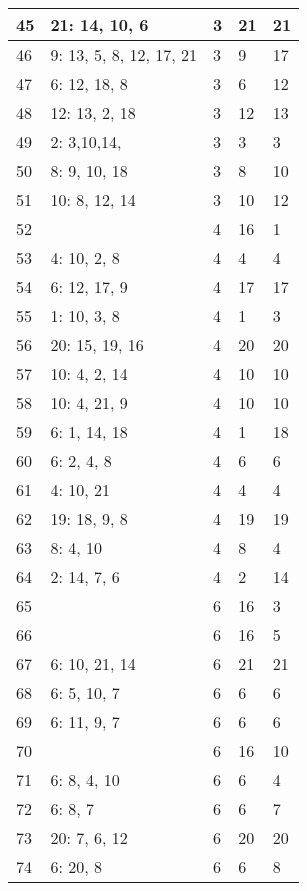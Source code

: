 \documentclass{article} %
\begin{document}
\begin{longtable}{| l | l | l | l | l |}
        45 & 21: 14, 10, 6 & 3 & 21 & 21 \\ \hline
        46 & 9: 13, 5, 8, 12, 17, 21 & 3 & 9 & 17 \\ \hline
        47 & 6: 12, 18, 8 & 3 & 6 & 12 \\ \hline
        48 & 12: 13, 2, 18 & 3 & 12 & 13 \\ \hline
        49 & 2: 3,10,14, & 3 & 3 & 3 \\ \hline
        50 & 8: 9, 10, 18 & 3 & 8 & 10 \\ \hline
        51 & 10: 8, 12, 14 & 3 & 10 & 12 \\ \hline
        52 &  & 4 & 16 & 1 \\ \hline
        53 & 4: 10, 2, 8 & 4 & 4 & 4 \\ \hline
        54 & 6: 12, 17, 9 & 4 & 17 & 17 \\ \hline
        55 & 1: 10, 3, 8 & 4 & 1 & 3 \\ \hline
        56 & 20: 15, 19, 16 & 4 & 20 & 20 \\ \hline
        57 & 10: 4, 2, 14 & 4 & 10 & 10 \\ \hline
        58 & 10: 4, 21, 9 & 4 & 10 & 10 \\ \hline
        59 & 6: 1, 14, 18 & 4 & 1 & 18 \\ \hline
        60 & 6: 2, 4, 8 & 4 & 6 & 6 \\ \hline
        61 & 4: 10, 21 & 4 & 4 & 4 \\ \hline
        62 & 19: 18, 9, 8 & 4 & 19 & 19 \\ \hline
        63 & 8: 4, 10 & 4 & 8 & 4 \\ \hline
        64 & 2: 14, 7, 6 & 4 & 2 & 14 \\ \hline
        65 &  & 6 & 16 & 3 \\ \hline
        66 &  & 6 & 16 & 5 \\ \hline
        67 & 6: 10, 21, 14 & 6 & 21 & 21 \\ \hline
        68 & 6: 5, 10, 7 & 6 & 6 & 6 \\ \hline
        69 & 6: 11, 9, 7 & 6 & 6 & 6 \\ \hline
        70 &  & 6 & 16 & 10 \\ \hline
        71 & 6: 8, 4, 10 & 6 & 6 & 4 \\ \hline
        72 & 6: 8, 7 & 6 & 6 & 7 \\ \hline
        73 & 20: 7, 6, 12 & 6 & 20 & 20 \\ \hline
        74 & 6: 20, 8 & 6 & 6 & 8 \\ \hline

\end{longtable}
\end{document}
